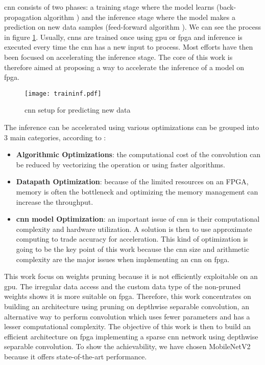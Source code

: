 \acrshort{cnn} consists of two phases: a training stage where the model learns (back-propagation algorithm \cite{lecun_backpropagation_1989}) and the inference stage where the model makes a prediction on new data samples (feed-forward algorithm \cite{zhang_optimizing_2015}). We can see the process in figure \ref{fig:traininf}. Usually, \acrshort{cnn}s are trained once using \acrshort{gpu} or \acrshort{fpga} and inference is executed every time the \acrshort{cnn} has a new input to process. Most efforts have then been focused on accelerating the inference stage. The core of this work is therefore aimed at proposing a way to accelerate the inference of a model on \acrshort{fpga}.
%
\begin{figure}
    \texttt{[image: traininf.pdf]}
    \caption{\acrshort{cnn} setup for predicting new data}
    \label{fig:traininf}
\end{figure}

The inference can be accelerated using various optimizations can be grouped into 3 main categories, according to \textcite{abdelouahab_accelerating_2018}:
\begin{itemize}
    \item \textbf{Algorithmic Optimizations}: the computational cost of the convolution can be reduced by vectorizing the operation or using faster algorithms.
    \item \textbf{Datapath Optimization}: because of the limited resources on an FPGA, memory is often the bottleneck and optimizing the memory management can increase the throughput.
    \item \textbf{\acrshort{cnn} model Optimization}: an important issue of \acrshort{cnn} is their computational complexity and hardware utilization. A solution is then to use approximate computing to trade accuracy for acceleration. This kind of optimization is going to be the key point of this work because the \acrshort{cnn} size and arithmetic complexity are the major issues when implementing an \acrshort{cnn} on \acrshort{fpga}.
\end{itemize}

This work focus on weights pruning because it is not efficiently exploitable on an \acrshort{gpu}. The irregular data access and the custom data type of the non-pruned weights shows it is more suitable on \acrshort{fpga}. Therefore, this work concentrates on building an architecture using pruning on depthwise separable convolution, an alternative way to perform convolution which uses fewer parameters and has a lesser computational complexity. The objective of this work is then to build an efficient architecture on \acrshort{fpga} implementing a sparse \acrshort{cnn} network using depthwise separable convolution. To show the achievability, we have chosen MobileNetV2 because it offers state-of-the-art performance.

